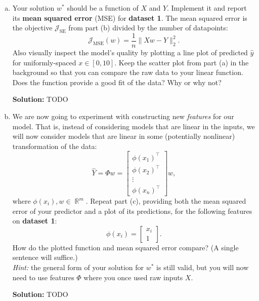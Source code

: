 \documentclass{article}
\DeclareMathOperator{\R}{\mathbb{R}}
\newenvironment{solution}{\color{blue} \smallskip \textbf{Solution:}}{}
\begin{document}
\begin{enumerate}[(a)]
    \begin{solution}
        TODO
    \end{solution}

    \item 
    Your solution $w^*$ should be a function of $X$ and $Y$. Implement it and report its \textbf{mean squared error} (MSE) for \textbf{dataset 1}. 
    The mean squared error is the objective $\mathcal{J}_\text{SE}$ from part (b) divided by the number of datapoints:
    \[
        \mathcal{J}_\text{MSE}(w) = \frac{1}{n} \| Xw - Y \|_2^2.
    \]
    Also visually inspect the model's quality by plotting a line plot of predicted $\hat{y}$ for uniformly-spaced $x \in [0, 10]$. 
    Keep the scatter plot from part (a) in the background so that you can compare the raw data to your linear function. 
    Does the function provide a good fit of the data? Why or why not?
    
    \begin{solution}
        TODO
    \end{solution}
    
    \item
    We are now going to experiment with constructing new \emph{features} for our model. 
    That is, instead of considering models that are linear in the inputs, we will now consider models that are linear in some (potentially nonlinear) transformation of the data:
    \[
        \hat{Y} = \Phi w = \begin{bmatrix}
            \phi(x_1)^\top \\
            \phi(x_2)^\top \\
            \vdots \\
            \phi(x_n)^\top
        \end{bmatrix} w,
    \]
    where $\phi(x_i), w \in \R^m$.
    Repeat part (c), providing both the mean squared error of your predictor and a plot of its predictions, for the following features on \textbf{dataset 1}:
    \[
        \phi(x_i) = \begin{bmatrix}
            x_i \\
            1
        \end{bmatrix}.
    \]
    How do the plotted function and mean squared error compare? (A single sentence will suffice.) \\
    \emph{Hint:} the general form of your solution for $w^*$ is still valid, but you will now need to use features $\Phi$ where you once used raw inputs $X$.

    \begin{solution}
        TODO
    \end{solution}
    

\end{enumerate}
\end{document}
